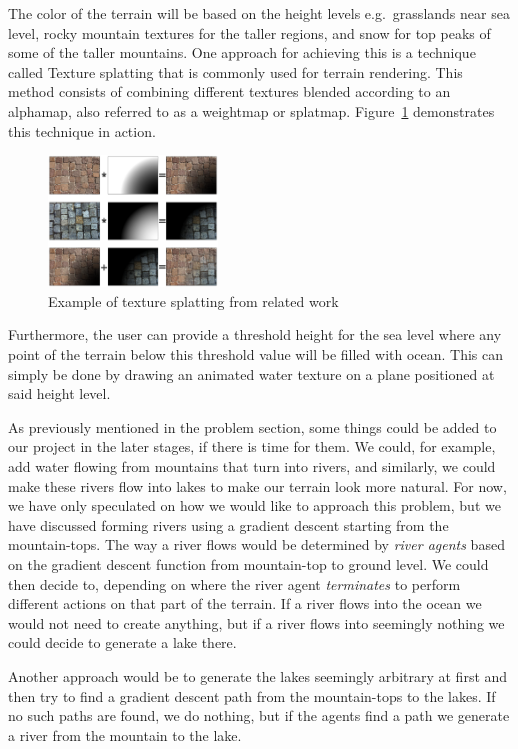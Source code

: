 The color of the terrain will be based on the height levels e.g.\ grasslands near sea level, rocky mountain textures for the taller regions, and snow for top peaks of some of the taller mountains.
One approach for achieving this is a technique called Texture splatting that is commonly used for terrain rendering.
This method consists of combining different textures blended according to an alphamap, also referred to as a weightmap or splatmap.
Figure~\ref{fig:texture-splatting} demonstrates this technique in action.

\begin{figure}[H]
  \centering
  \includegraphics[width=0.4\textwidth]{figure/texture-splatting.png}
  \caption{Example of texture splatting from related work \cite{wiki:texture-splatting-img}}
  \label{fig:texture-splatting}
\end{figure}

Furthermore, the user can provide a threshold height for the sea level where any point of the terrain below this threshold value will be filled with ocean. 
This can simply be done by drawing an animated water texture on a plane positioned at said height level. 

As previously mentioned in the problem section, some things could be added to our project in the later stages, if there is time for them. 
We could, for example, add water flowing from mountains that turn into rivers, and similarly, we could make these rivers flow into lakes to make our terrain look more natural.
For now, we have only speculated on how we would like to approach this problem, but we have discussed forming rivers using a gradient descent starting from the mountain-tops.
The way a river flows would be determined by \textit{river agents} based on the gradient descent function from mountain-top to ground level. 
We could then decide to, depending on where the river agent \textit{terminates}  to perform different actions on that part of the terrain.
If a river flows into the ocean we would not need to create anything, but if a river flows into seemingly nothing we could decide to generate a lake there. 

Another approach would be to generate the lakes seemingly arbitrary at first and then try to find a gradient descent path from the mountain-tops to the lakes.
If no such paths are found, we do nothing, but if the agents find a path we generate a river from the mountain to the lake. 
